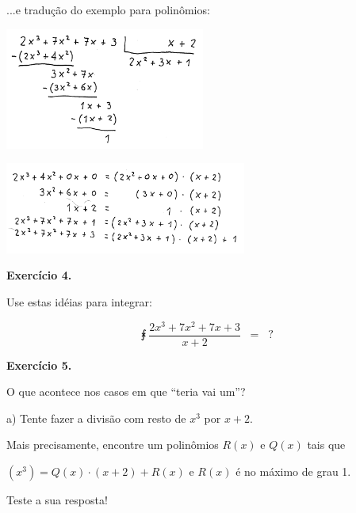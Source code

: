\documentclass[oneside,12pt]{article}
\begin{document}
\newpage


...e tradução do exemplo para polinômios:

\includegraphics[height=4cm]{2020-1-C2/20201118_C2_div_com_resto_2.pdf}

\includegraphics[height=3cm]{2020-1-C2/20201118_C2_div_com_resto_3.pdf}

\newpage


{\bf Exercício 4.}

\ssk

Use estas idéias para integrar:

$$\intx{\frac{2x^3 + 7x^2 + 7x + 3}{x+2}} \;\; = \;\; ?$$



\newpage

{\bf Exercício 5.}

\ssk

O que acontece nos casos em que ``teria vai um''?

\ssk

a) Tente fazer a divisão com resto de $x^3$ por $x+2$.

Mais precisamente, encontre um polinômios $R(x)$ e $Q(x)$ tais que

$(x^3) = Q(x) · (x+2) + R(x)$ e $R(x)$ é no máximo de grau 1.

Teste a sua resposta!

\ssk
\end{document}
